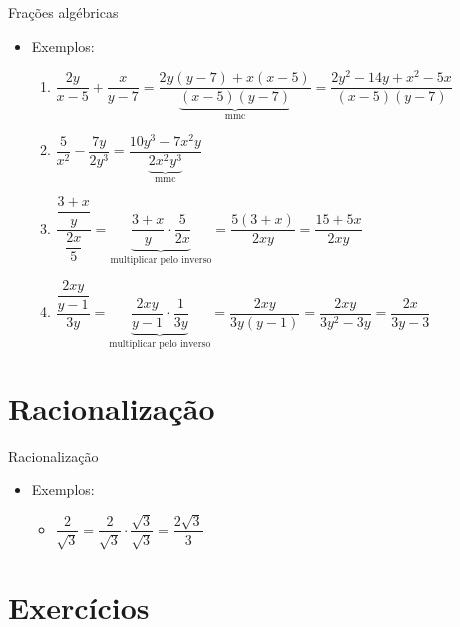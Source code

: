 \documentclass[14pt, aspectratio=169]{beamer}
\newcommand{\skipframe}{\vspace{10.0cm}}
\begin{document}
\begin{frame}[allowframebreaks]{Frações algébricas}
    \begin{itemize}
        \item Exemplos:
        \begin{enumerate}[a]
            \item $\dfrac{2y}{x-5} + \dfrac{x}{y-7} = \dfrac{2y(y-7)+x(x-5)}{\underbrace{(x-5)(y-7)}_{\text{mmc}}} = \dfrac{2y^2-14y+x^2-5x}{(x-5)(y-7)}$
            \item $\dfrac{5}{x^2} - \dfrac{7y}{2y^3} = \dfrac{10y^3-7x^2y}{\underbrace{2x^2y^3}_{\text{mmc}}}$

            \skipframe

            \item $\dfrac{\dfrac{3+x}{y}}{\dfrac{2x}{5}} = \underbrace{\dfrac{3+x}{y} \cdot \dfrac{5}{2x}}_{\text{multiplicar pelo inverso}}  = \dfrac{5(3+x)}{2xy} = \dfrac{15+5x}{2xy}$
            \item $\dfrac{\dfrac{2xy}{y-1}}{3y} = \underbrace{\dfrac{2xy}{y-1} \cdot \dfrac{1}{3y}}_{\text{multiplicar pelo inverso}} = \dfrac{2xy}{3y(y-1)} = \dfrac{2xy}{3y^2-3y} = \dfrac{2x}{3y-3}$
        \end{enumerate}
    \end{itemize}
\end{frame}

\section{Racionalização}

\begin{frame}[allowframebreaks]{Racionalização}

\begin{itemize}
    \item Exemplos:
    \begin{itemize}
        \item $\dfrac{2}{\sqrt{3}} = \dfrac{2}{\sqrt{3}} \cdot \dfrac{\sqrt{3}}{\sqrt{3}} = \dfrac{2\sqrt{3}}{3}$
    \end{itemize}
    
\end{itemize}
    
\end{frame}

\section{Exercícios}
\end{document}
